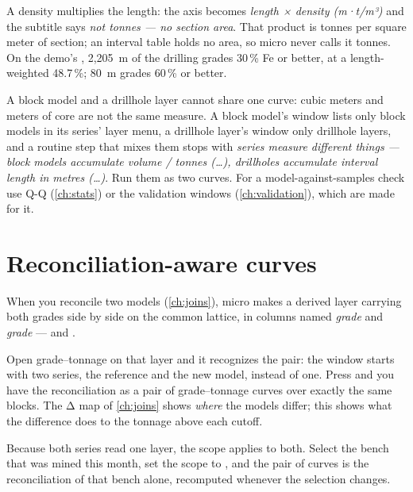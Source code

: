 A density multiplies the length: the axis becomes \emph{length × density (m·t/m³)} and the subtitle says \emph{not tonnes — no section area}. That product is tonnes per square meter of section; an interval table holds no area, so micro never calls it tonnes. On the demo's , 2,205~m of the drilling grades 30\,\% Fe or better, at a length-weighted 48.7\,\%; 80~m grades 60\,\% or better.

\begin{caution}
A block model and a drillhole layer cannot share one curve: cubic meters and meters of core are not the same measure. A block model's window lists only block models in its series' layer menu, a drillhole layer's window only drillhole layers, and a routine step that mixes them stops with \emph{series measure different things — block models accumulate volume / tonnes (…), drillholes accumulate interval length in metres (…)}. Run them as two curves. For a model-against-samples check use Q-Q (\cref{ch:stats}) or the validation windows (\cref{ch:validation}), which are made for it.
\end{caution}

\section{Reconciliation-aware curves}\label{sec:gt-reconcile}
When you reconcile two models (\cref{ch:joins}), micro makes a derived layer carrying both grades side by side on the common lattice, in columns named \emph{grade} and \emph{grade} —  and .

Open grade–tonnage on that layer and it recognizes the pair: the window starts with two series, the reference and the new model, instead of one. Press  and you have the reconciliation as a pair of grade–tonnage curves over exactly the same blocks. The Δ map of \cref{ch:joins} shows \emph{where} the models differ; this shows what the difference does to the tonnage above each cutoff.

Because both series read one layer, the scope applies to both. Select the bench that was mined this month, set the scope to , and the pair of curves is the reconciliation of that bench alone, recomputed whenever the selection changes.

